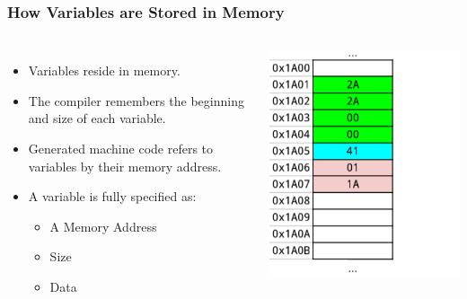 \documentclass[handout]{beamer}
\begin{document}
\begin{frame}
    \frametitle{How Variables are Stored in Memory}
    \begin{columns}
        \begin{itemize}
            \item Variables reside in memory.
            \item The compiler remembers the beginning 
                and size of each variable.
            \item Generated machine code refers to variables
                by their memory address.
            \item A variable is fully specified as:
                \begin{itemize}
                    \item A Memory Address
                    \item Size
                    \item Data 
                \end{itemize}
        \end{itemize}
        \includegraphics[height=0.60\textheight]{images/memdata}
    \end{columns}
\end{frame}
\end{document}
